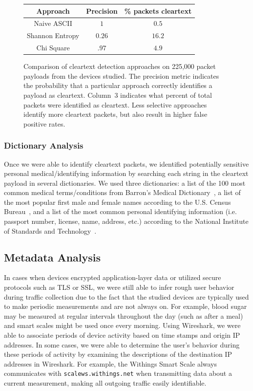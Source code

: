 \begin{figure}
  \begin{center}
    \begin{tabular}{c|c|c} 
    \textbf{Approach} & \textbf{Precision} & \textbf{\% packets cleartext}\\ [0.5ex] 
    \hline
    Naive ASCII & $1$ & $0.5$ \\ 
    Shannon Entropy &  $0.26$ & $16.2$ \\
    Chi Square & $.97$ & $4.9$ \\
    \end{tabular}
    \caption{Comparison of cleartext detection approaches on 225,000 packet payloads from the devices studied. The precision metric indicates the probability that a particular approach correctly identifies a payload as cleartext. Column~3 indicates what percent of total packets were identified as cleartext. Less selective approaches identify more cleartext packets, but also result in higher false positive rates.}
    \label{fig:method-comp}
  \end{center}
\end{figure}

\subsubsection{Dictionary Analysis}
Once we were able to identify cleartext packets, we identified potentially sensitive personal medical/identifying information by searching each string in the cleartext payload in several dictionaries. We used three dictionaries: a list of the 100 most common medical terms/conditions from Barron's Medical Dictionary~\cite{barrons}, a list of the most popular first male and female names according to the U.S. Census Bureau~\cite{names}, and a list of the most common personal identifying information (i.e. passport number, license, name, address, etc.) according to the National Institute of Standards and Technology~\cite{nist}. 

\subsection{Metadata Analysis}

In cases when devices encrypted application-layer data or utilized secure
protocols such as TLS or SSL, we were still able to infer rough user behavior
during traffic collection due to the fact that the studied devices are typically used to make
periodic measurements and are not always on. For example, blood
sugar may be measured at regular intervals throughout the day (such as after a
meal) and smart scales might be used once every morning. Using Wireshark, we
were able to associate periods of device activity based on time stamps and
origin IP addresses. In some
cases, we were able to determine the user's behavior during these
periods of activity by examining the descriptions of the destination IP
addresses in Wireshark. For example, the Withings Smart Scale always
communicates with {\tt scalews.withings.net} when transmitting data
about a current measurement, making all outgoing traffic easily identifiable.

